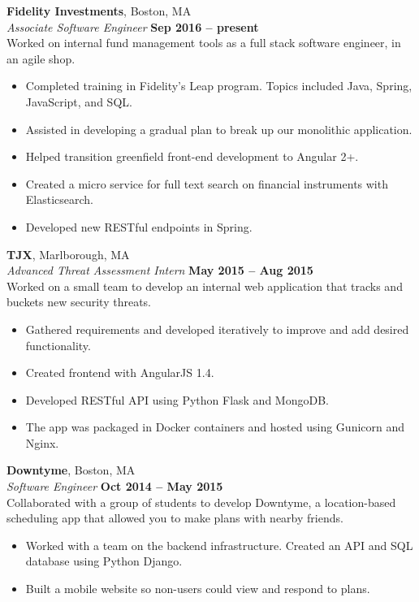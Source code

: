 \documentclass[margin,line]{resume}
\begin{document}
\begin{resume}
    \textbf{Fidelity Investments}, Boston, MA \vspace{2mm}\\\vspace{1mm}%
    \textsl{Associate Software Engineer} \hfill \textbf{Sep 2016 -- present}\\
    Worked on internal fund management tools
	as a full stack software engineer, in an agile shop.
    \begin{itemize}
    \item Completed training in Fidelity's Leap program. Topics included Java, Spring, JavaScript, and SQL.
    \item Assisted in developing a gradual plan to break up our monolithic application.
	\item Helped transition greenfield front-end development to Angular 2+.
	\item Created a micro service for full text search on financial instruments with Elasticsearch. 
    \item Developed new RESTful endpoints in Spring.
    \end{itemize}

    \textbf{TJX}, Marlborough, MA \vspace{2mm}\\\vspace{1mm}%
    \textsl{Advanced Threat Assessment Intern} \hfill \textbf{May 2015 -- Aug 2015}\\
    Worked on a small team to develop an internal web application that tracks and buckets new security threats.
    \begin{itemize}
    	\item Gathered requirements and developed iteratively to improve and add desired functionality.
    	\item Created frontend with AngularJS 1.4.
    	\item Developed RESTful API using Python Flask and MongoDB.
    	\item The app was packaged in Docker containers and hosted using Gunicorn and Nginx.
    \end{itemize}
    \textbf{Downtyme}, Boston, MA \vspace{2mm}\\\vspace{1mm}%
    \textsl{Software Engineer} \hfill \textbf{Oct 2014 -- May 2015}\\
    Collaborated with a group of students to develop Downtyme, a location-based scheduling app that allowed you to make plans with nearby friends.
    \begin{itemize}
    	\item Worked with a team on the backend infrastructure. Created an API and SQL database using Python Django.
    	\item Built a mobile website so non-users could view and respond to plans.
    \end{itemize}

\end{resume}
\end{document}
